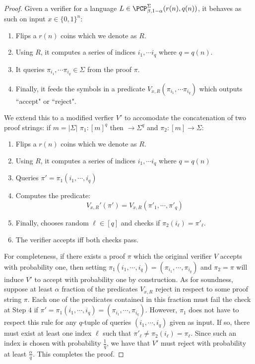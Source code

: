 \begin{proof}
Given a verifier for a language $L \in \PCP^\Sigma_{\beta, 1 - \alpha}(r(n),q(n))$, it behaves as such on input $x \in \{0,1\}^n$:
%
\begin{enumerate}
  \item Flips a $r(n)$ coins which we denote as $R$.
  \item Using $R$, it computes a series of indices $i_1, \cdots i_q$ where $q = q(n)$.
  \item It queries $\pi_{i_1}, \cdots \pi_{i_q}\in \Sigma$ from the proof $\pi$.
  \item Finally, it feeds the symbols in a predicate $V_{x,R}(\pi_{i_1}, \cdots \pi_{i_q})$ which outputs ``accept" or ``reject".
\end{enumerate}
We extend this to a modified verfier $V'$ to accomodate the concatenation of two proof strings: if $m = |\Sigma|$ $\pi_1:[m]^q$ then $\rightarrow \Sigma^{q}$ and $\pi_2:[m]\rightarrow \Sigma$:
%
\begin{enumerate}
  \item Flips a $r(n)$ coins which we denote as $R$.
  \item Using $R$, it computes a series of indices $i_1, \cdots i_q$ where $q = q(n)$
  \item Queries $\pi' = \pi_1(i_1, \cdots, i_q)$
  \item Computes the predicate:
  \[ V_{x,R}'(\pi') = V_{x,R}(\pi'_1,\cdots,\pi'_q) \]
  \item Finally, chooses random $\ell \in [q]$ and checks if $\pi_2(i_\ell) = \pi'_\ell$.
  \item The verifier accepts iff both checks pass.
\end{enumerate}

For completeness, if there exists a proof $\pi$ which the original verifier $V$ accepts with probability one, then setting $\pi_1(i_1, \cdots, i_q) = (\pi_{i_1},\cdots,\pi_{i_q})$ and $\pi_2 = \pi$ will induce $V'$ to accept with probability one by construction.
%
As for soundness, suppose  at least $\alpha$ fraction of the predicates $V_{x,R}$ reject in respect to some proof string $\pi$. Each one of the predicates contained in this fraction must fail the check at Step $4$ if $\pi' = \pi_1(i_1, \cdots, i_q) = (\pi_{i_1},\cdots,\pi_{i_q})$. However, $\pi_1$ does not have to respect this rule for any $q$-tuple of queries $(i_1, \cdots, i_q)$ given as input. If so, there must exist at least one index $\ell$ such that $\pi'_\ell \neq \pi_2(i_\ell) = \pi_\ell$. Since such an index is chosen with probability $\frac{1}{q}$, we have that $V'$ must reject with probability at least $\frac{\alpha}{q}$. This completes the proof.
\end{proof}


